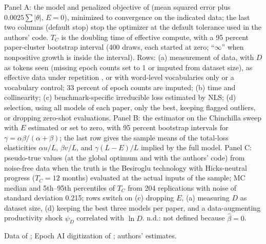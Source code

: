 \begin{table}[tp]
\begin{tablenotes}Panel A: the model and penalized objective of \citet{ho2024algorithmic} (mean squared error plus $0.0025\sum|\theta|$, $E=0$), minimized to convergence on the indicated data; the last two columns (default stop) stop the optimizer at the default tolerance used in the authors' code. $T_C$ is the doubling time of effective compute, with a 95 percent paper-cluster bootstrap interval (400 draws, each started at zero; ``$\infty$'' when nonpositive growth is inside the interval). Rows: (a) measurement of data, with $D$ as tokens seen (missing epoch counts set to 1 or imputed from dataset size), as effective data under repetition \citep[$R^*=15.4$;][]{muennighoff2023scaling}, or with word-level vocabularies only or a vocabulary control; 33 percent of epoch counts are imputed; (b) time and collinearity; (c) benchmark-specific irreducible loss estimated by NLS; (d) selection, using all models of each paper, only the best, keeping flagged outliers, or dropping zero-shot evaluations. Panel B: the \citet{besiroglu2024chinchilla} estimator on the Chinchilla sweep with $E$ estimated or set to zero, with 95 percent bootstrap intervals for $\gamma=\alpha\beta/(\alpha+\beta)$; the last row gives the sample means of the total-loss elasticities $\alpha u/L$, $\beta v/L$, and $\gamma(L-E)/L$ implied by the full model. Panel C: pseudo-true values (at the global optimum and with the authors' code) from noise-free data when the truth is the Besiroglu technology with Hicks-neutral progress ($T_C=12$ months) evaluated at the actual inputs of the sample; MC median and 5th--95th percentiles of $T_C$ from 204 replications with noise of standard deviation 0.215; rows switch on (c) dropping $E$, (a) measuring $D$ as dataset size, (d) keeping the best three models per paper, and a data-augmenting productivity shock $\psi_D$ correlated with $\ln D$. n.d.: not defined because $\hat\beta=0$.\end{tablenotes}
\begin{tablenotes}[Source]Data of \citet{ho2024algorithmic}; Epoch AI digitization of \citet{hoffmann2022training}; authors' estimates.\end{tablenotes}
\end{table}
